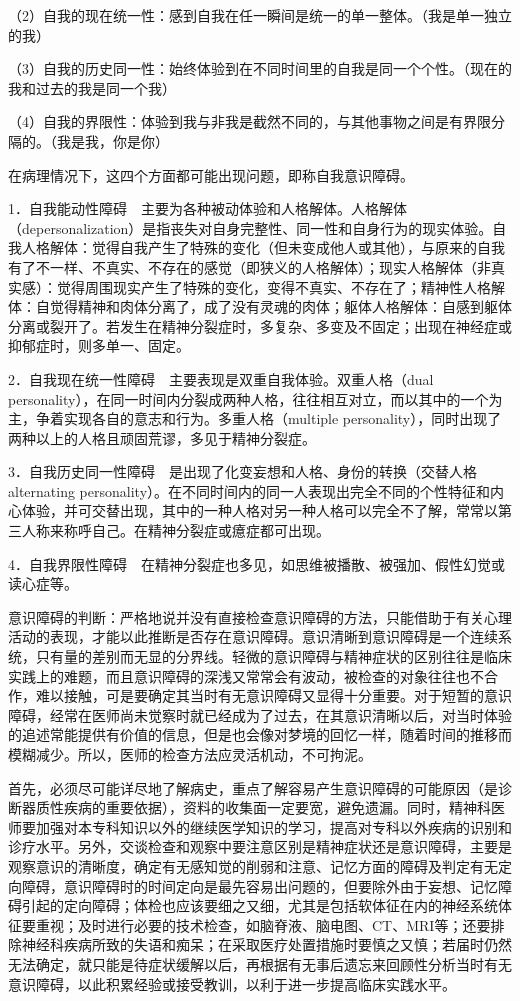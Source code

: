 （2）自我的现在统一性：感到自我在任一瞬间是统一的单一整体。（我是单一独立的我）

（3）自我的历史同一性：始终体验到在不同时间里的自我是同一个个性。（现在的我和过去的我是同一个我）

（4）自我的界限性：体验到我与非我是截然不同的，与其他事物之间是有界限分隔的。（我是我，你是你）

在病理情况下，这四个方面都可能出现问题，即称自我意识障碍。

1．自我能动性障碍　主要为各种被动体验和人格解体。人格解体（depersonalization）是指丧失对自身完整性、同一性和自身行为的现实体验。自我人格解体：觉得自我产生了特殊的变化（但未变成他人或其他），与原来的自我有了不一样、不真实、不存在的感觉（即狭义的人格解体）；现实人格解体（非真实感）：觉得周围现实产生了特殊的变化，变得不真实、不存在了；精神性人格解体：自觉得精神和肉体分离了，成了没有灵魂的肉体；躯体人格解体：自感到躯体分离或裂开了。若发生在精神分裂症时，多复杂、多变及不固定；出现在神经症或抑郁症时，则多单一、固定。

2．自我现在统一性障碍　主要表现是双重自我体验。双重人格（dual
personality），在同一时间内分裂成两种人格，往往相互对立，而以其中的一个为主，争着实现各自的意志和行为。多重人格（multiple
personality），同时出现了两种以上的人格且顽固荒谬，多见于精神分裂症。

3．自我历史同一性障碍　是出现了化变妄想和人格、身份的转换（交替人格alternating
personality）。在不同时间内的同一人表现出完全不同的个性特征和内心体验，并可交替出现，其中的一种人格对另一种人格可以完全不了解，常常以第三人称来称呼自己。在精神分裂症或癔症都可出现。

4．自我界限性障碍　在精神分裂症也多见，如思维被播散、被强加、假性幻觉或读心症等。

意识障碍的判断：严格地说并没有直接检查意识障碍的方法，只能借助于有关心理活动的表现，才能以此推断是否存在意识障碍。意识清晰到意识障碍是一个连续系统，只有量的差别而无显的分界线。轻微的意识障碍与精神症状的区别往往是临床实践上的难题，而且意识障碍的深浅又常常会有波动，被检查的对象往往也不合作，难以接触，可是要确定其当时有无意识障碍又显得十分重要。对于短暂的意识障碍，经常在医师尚未觉察时就已经成为了过去，在其意识清晰以后，对当时体验的追述常能提供有价值的信息，但是也会像对梦境的回忆一样，随着时间的推移而模糊减少。所以，医师的检查方法应灵活机动，不可拘泥。

首先，必须尽可能详尽地了解病史，重点了解容易产生意识障碍的可能原因（是诊断器质性疾病的重要依据），资料的收集面一定要宽，避免遗漏。同时，精神科医师要加强对本专科知识以外的继续医学知识的学习，提高对专科以外疾病的识别和诊疗水平。另外，交谈检查和观察中要注意区别是精神症状还是意识障碍，主要是观察意识的清晰度，确定有无感知觉的削弱和注意、记忆方面的障碍及判定有无定向障碍，意识障碍时的时间定向是最先容易出问题的，但要除外由于妄想、记忆障碍引起的定向障碍；体检也应该要细之又细，尤其是包括软体征在内的神经系统体征要重视；及时进行必要的技术检查，如脑脊液、脑电图、CT、MRI等；还要排除神经科疾病所致的失语和痴呆；在采取医疗处置措施时要慎之又慎；若届时仍然无法确定，就只能是待症状缓解以后，再根据有无事后遗忘来回顾性分析当时有无意识障碍，以此积累经验或接受教训，以利于进一步提高临床实践水平。

